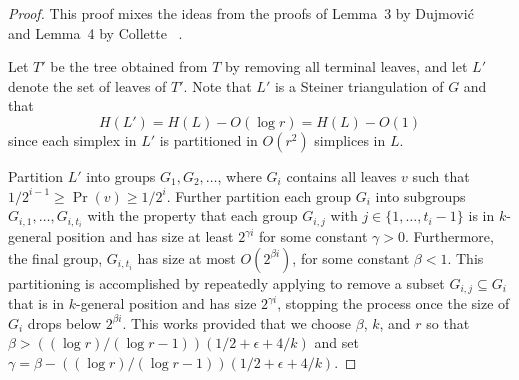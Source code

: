 \documentclass{patmorin}
\begin{document}
\begin{proof}
  This proof mixes the ideas from the proofs of Lemma~3 by Dujmovi\'c
  \etal\ \cite{dhm09} and Lemma~4 by Collette \etal\ \cite{cdilm08}.

  Let $T'$ be the tree obtained from $T$ by removing all terminal leaves,
  and let $L'$ denote the set of leaves of $T'$.  Note that $L'$ is a Steiner
  triangulation of $G$ and that 
  \[  
     H(L') = H(L) - O(\log r) = H(L) - O(1)
  \]
  since each simplex in $L'$ is partitioned in $O(r^2)$ simplices in $L$. 

  Partition $L'$ into groups $G_1,G_2,\ldots$, where $G_i$
  contains all leaves $v$ such that $1/2^{i-1} \ge \Pr(v) \ge
  1/2^{i}$.  Further partition each group $G_i$ into subgroups
  $G_{i,1},\ldots,G_{i,t_i}$ with the property that each group $G_{i,j}$
  with $j\in\{1,\ldots,t_i-1\}$ is in $k$-general position and has size
  at least $2^{\gamma i}$ for some constant $\gamma > 0$. Furthermore,
  the final group, $G_{i,t_i}$ has size at most $O(2^{\beta i})$, for some
  constant $\beta < 1$.  This partitioning is accomplished by repeatedly
  applying  to remove a subset $G_{i,j}\subseteq
  G_{i}$ that is in $k$-general position and has size $2^{\gamma i}$,
  stopping the process once the size of $G_i$ drops below $2^{\beta
  i}$. This works provided that we choose $\beta$, $k$, and $r$ so
  that $\beta > ((\log r)/(\log r - 1))(1/2+\epsilon+4/k)$ and set
  $\gamma=\beta - ((\log r)/(\log r - 1))(1/2+\epsilon+4/k)$.


\end{proof}
\end{document}
